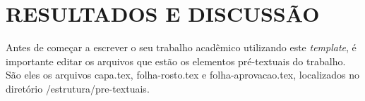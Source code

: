 
\chapter{RESULTADOS E DISCUSSÃO}
\label{chap:resultadosDiscussao}

Antes de começar a escrever o seu trabalho acadêmico utilizando este \emph{template}, é importante editar os arquivos que estão os elementos pré-textuais do trabalho.
São eles os arquivos {\ttfamily capa.tex}, {\ttfamily folha-rosto.tex} e {\ttfamily folha-aprovacao.tex}, localizados no diretório  {\ttfamily /estrutura/pre-textuais}.
